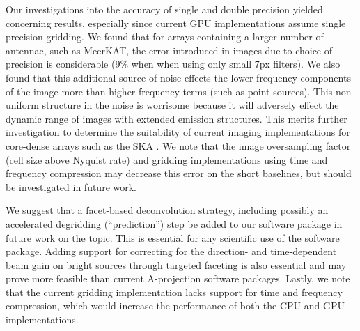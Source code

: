 Our investigations into the accuracy of single and double precision yielded concerning results, especially since current GPU implementations assume single precision gridding. We found
that for arrays containing a larger number of antennae, such as MeerKAT, the error introduced in images due to choice of precision is considerable (9\% when when using only small 7px filters). 
We also found that this additional source of noise effects the lower frequency components of the image more than higher frequency terms (such as point sources). This 
non-uniform structure in the noise is worrisome because it will adversely effect the dynamic range of images with extended emission structures. This merits further investigation
to determine the suitability of current imaging implementations for core-dense arrays such as the SKA \cite{skaconfig}. We note that the image oversampling factor 
(cell size above Nyquist rate) and gridding implementations using time and frequency compression may decrease this error on the short baselines, but should be investigated 
in future work.

We suggest that a facet-based deconvolution strategy, including possibly an accelerated degridding (``prediction'') step be added to our software package in future work on the topic. This
is essential for any scientific use of the software package. Adding support for correcting for the direction- and time-dependent beam gain on bright sources through targeted faceting is
also essential and may prove more feasible than current A-projection software packages. Lastly, we note that the current gridding implementation lacks support for time and frequency compression,
which would increase the performance of both the CPU and GPU implementations.

